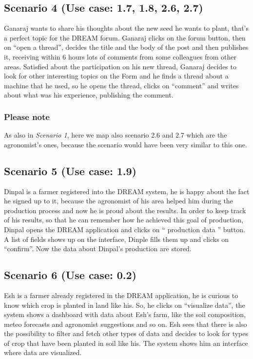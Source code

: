 \documentclass[10pt]{report}
\begin{document}
\subsection{Scenario 4 (Use case: 1.7, 1.8, 2.6, 2.7)}
Ganaraj wants to share his thoughts about the new seed he wants to plant, that’s a perfect topic for the DREAM forum. Ganaraj clicks on the forum button, then on “open a thread”, decides the title and the body of the post and then publishes it, receiving within 6 hours lots of comments from some colleagues from other areas. 
Satisfied about the participation on his new thread, Ganaraj decides to look for other interesting topics on the Form and he finds a thread about a machine that he used, so he opens the thread, clicks on “comment” and writes about what was his experience, publishing the comment.  
\subsubsection{Please note}
As also in \textit{Scenario 1}, here we map also scenario 2.6 and 2.7 which are the agronomist's ones, because the scenario would have been very similar to this one.
\subsection{Scenario 5 (Use case: 1.9)}
Dinpal is a farmer registered into the DREAM system, he is happy about the fact he signed up to it, because the agronomist of his area helped him during the production process and now he is proud about the results. In order to keep track of his results, so that he can remember how he achieved this goal of production, Dinpal opens the DREAM application and clicks on “ production data '' button. A list of fields shows up on the interface, Dinple fills them up and clicks on “confirm”. Now the data about Dinpal’s production are stored.

\subsection{Scenario 6 (Use case: 0.2)}
Esh is a farmer already registered in the DREAM application, he is curious to know which crop is planted in land like his. So, he clicks on “visualize data”, the system shows a dashboard with data about Esh’s farm, like the soil composition, meteo forecasts and agronomist suggestions and so on. Esh sees that there is also the possibility to filter and fetch other types of data and decides to look for types of crop that have been planted in soil like his. The system shows him an interface where data are visualized.
\end{document}
